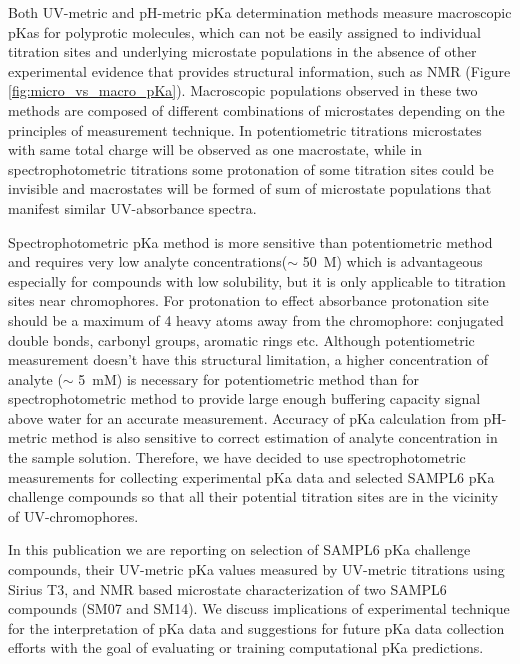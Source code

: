 \documentclass[9pt,lineno]{elife}
\begin{document}
Both UV-metric and pH-metric pKa determination methods measure macroscopic pKas for polyprotic molecules, which can not be easily assigned to individual titration sites and underlying microstate populations in the absence of other experimental evidence that provides structural information, such as NMR (Figure \ref{fig:micro_vs_macro_pKa}). Macroscopic populations observed in these two methods are composed of different combinations of microstates depending on the principles of measurement technique. In potentiometric titrations microstates with same total charge will be observed as one macrostate, while in spectrophotometric titrations some protonation of some titration sites could be invisible and macrostates will be formed of sum of microstate populations that manifest similar UV-absorbance spectra.

Spectrophotometric pKa method is more sensitive than potentiometric method and requires very low analyte concentrations($\sim$ 50~\micro M) which is advantageous especially for compounds with low solubility, but it is only applicable to titration sites near chromophores. For protonation to effect absorbance protonation site should be a maximum of 4 heavy atoms away from the chromophore: conjugated double bonds, carbonyl groups, aromatic rings etc.
Although potentiometric measurement doesn't have this structural limitation, a higher concentration of analyte ($\sim$ 5~mM) is necessary for potentiometric method than for spectrophotometric method to provide large enough buffering capacity signal above water for an accurate measurement. Accuracy of pKa calculation from pH-metric method is also sensitive to correct estimation of analyte concentration in the sample solution. Therefore, we have decided to use spectrophotometric measurements for collecting experimental pKa data and selected SAMPL6 pKa challenge compounds so that all their potential titration sites are in the vicinity of UV-chromophores.

In this publication we are reporting on selection of SAMPL6 pKa challenge compounds, their UV-metric pKa values measured by UV-metric titrations using Sirius T3, and NMR based microstate characterization of two SAMPL6 compounds (SM07 and SM14). We discuss implications of experimental technique for the interpretation of pKa data and suggestions for future pKa data collection efforts with the goal of evaluating or training computational pKa predictions.

\end{document}
